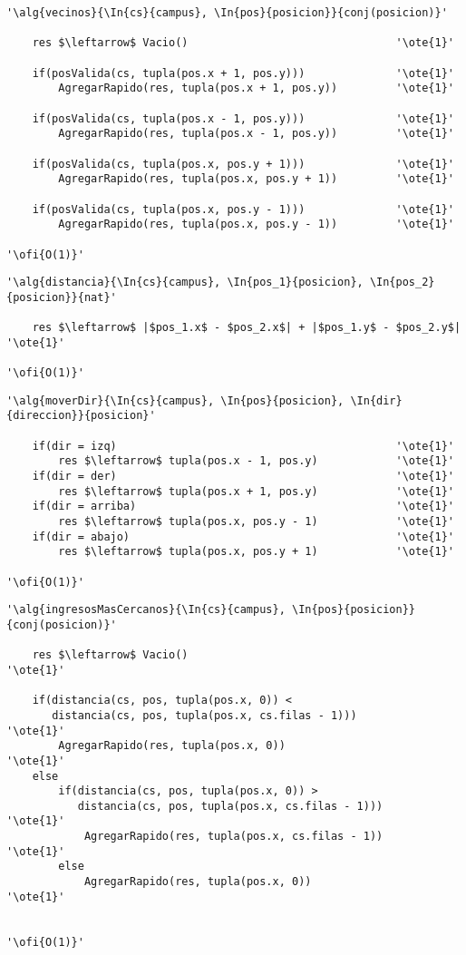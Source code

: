 \begin{lstlisting}[mathescape]
'\alg{vecinos}{\In{cs}{campus}, \In{pos}{posicion}}{conj(posicion)}'

	res $\leftarrow$ Vacio() 								'\ote{1}'

	if(posValida(cs, tupla(pos.x + 1, pos.y))) 				'\ote{1}'
		AgregarRapido(res, tupla(pos.x + 1, pos.y))			'\ote{1}'	

	if(posValida(cs, tupla(pos.x - 1, pos.y))) 				'\ote{1}'
		AgregarRapido(res, tupla(pos.x - 1, pos.y))			'\ote{1}'	

	if(posValida(cs, tupla(pos.x, pos.y + 1))) 				'\ote{1}'
		AgregarRapido(res, tupla(pos.x, pos.y + 1))			'\ote{1}'

	if(posValida(cs, tupla(pos.x, pos.y - 1)))				'\ote{1}'
		AgregarRapido(res, tupla(pos.x, pos.y - 1))			'\ote{1}'

'\ofi{O(1)}'
\end{lstlisting}

\begin{lstlisting}[mathescape]
'\alg{distancia}{\In{cs}{campus}, \In{pos_1}{posicion}, \In{pos_2}{posicion}}{nat}'
	
	res $\leftarrow$ |$pos_1.x$ - $pos_2.x$| + |$pos_1.y$ - $pos_2.y$|	'\ote{1}'

'\ofi{O(1)}'
\end{lstlisting}

\begin{lstlisting}[mathescape]
'\alg{moverDir}{\In{cs}{campus}, \In{pos}{posicion}, \In{dir}{direccion}}{posicion}'

	if(dir = izq)											'\ote{1}'
		res $\leftarrow$ tupla(pos.x - 1, pos.y)			'\ote{1}'
	if(dir = der)											'\ote{1}'
		res $\leftarrow$ tupla(pos.x + 1, pos.y)			'\ote{1}'
	if(dir = arriba)										'\ote{1}'
		res $\leftarrow$ tupla(pos.x, pos.y - 1)			'\ote{1}'
	if(dir = abajo)											'\ote{1}'
		res $\leftarrow$ tupla(pos.x, pos.y + 1)			'\ote{1}'

'\ofi{O(1)}'
\end{lstlisting}

\begin{lstlisting}[mathescape]
'\alg{ingresosMasCercanos}{\In{cs}{campus}, \In{pos}{posicion}}{conj(posicion)}'

	res $\leftarrow$ Vacio()										'\ote{1}'

	if(distancia(cs, pos, tupla(pos.x, 0)) < 
	   distancia(cs, pos, tupla(pos.x, cs.filas - 1))) 				'\ote{1}'
		AgregarRapido(res, tupla(pos.x, 0))							'\ote{1}'
	else
		if(distancia(cs, pos, tupla(pos.x, 0)) > 
		   distancia(cs, pos, tupla(pos.x, cs.filas - 1))) 			'\ote{1}'
			AgregarRapido(res, tupla(pos.x, cs.filas - 1))			'\ote{1}'
		else
			AgregarRapido(res, tupla(pos.x, 0))						'\ote{1}'


'\ofi{O(1)}'
\end{lstlisting}